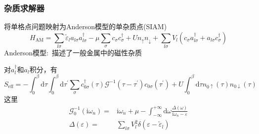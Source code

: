 \frame
{
	\frametitle{杂质求解器}
	将单格点问题映射为\textrm{Anderson}模型的单杂质点\textrm{(SIAM)}
	\begin{displaymath}
			H_{\mathrm{AM}}=\sum_{l\sigma}\tilde{\varepsilon}_la_{l\sigma}a_{l\sigma}^{\dag}-\mu\sum_{\sigma}c_{\sigma}c_{\sigma}^{\dag}+Un_{\uparrow}n_{\downarrow}+\sum_{l\sigma}V_l(c_{\sigma}a_{l\sigma}^{\dag}+a_{l\sigma}c_{\sigma}^{\dag})
	\end{displaymath}
	\textrm{Anderson}模型:~描述了一般金属中的磁性杂质

	对$a_l^{\dag}$和$a_l$积分，有
	\begin{displaymath}
		S_{\mathrm{eff}}=-\int_0^{\beta}\mathrm{d}\tau\int_0^{\beta}\mathrm{d}\tau^{\prime}\sum_{\sigma}c_{0\sigma}^{\dag}(\tau)\mathcal{G}^{-1}(\tau-\tau^{\prime})c_{0\sigma}(\tau^{\prime})+U\int_0^{\beta}\mathrm{d}\tau n_{0\uparrow}(\tau)n_{0\downarrow}(\tau)
	\end{displaymath}
这里
\begin{displaymath}
	\begin{aligned}
		\mathcal{G}_0^{-1}(\mathrm{i}\omega_n)=&\mathrm{i}\omega_n+\mu-\int_{-\infty}^{+\infty}\mathrm{d}\omega\frac{\Delta(\omega)}{\mathrm{i}\omega_n-\varepsilon}\\
		\Delta(\varepsilon)=&\sum_{l\sigma}V_l^2\delta(\varepsilon-\tilde{\varepsilon}_l)
	\end{aligned}
\end{displaymath}
}


